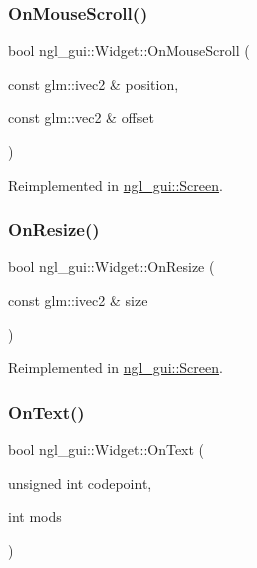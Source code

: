 \subsubsection{\texorpdfstring{On\+Mouse\+Scroll()}{OnMouseScroll()}}
{\footnotesize\ttfamily bool ngl\+\_\+gui\+::\+Widget\+::\+On\+Mouse\+Scroll (\begin{DoxyParamCaption}\item[{const glm\+::ivec2 \&}]{position,  }\item[{const glm\+::vec2 \&}]{offset }\end{DoxyParamCaption})\hspace{0.3cm}{\ttfamily [virtual]}}



Reimplemented in \mbox{\hyperlink{classngl__gui_1_1_screen_a9aca448e61f50b24bfa2a5782424b910}{ngl\+\_\+gui\+::\+Screen}}.

\mbox{\label{classngl__gui_1_1_widget_ab360115cc08879ea3f9b301bdccc05ce}} 
\subsubsection{\texorpdfstring{On\+Resize()}{OnResize()}}
{\footnotesize\ttfamily bool ngl\+\_\+gui\+::\+Widget\+::\+On\+Resize (\begin{DoxyParamCaption}\item[{const glm\+::ivec2 \&}]{size }\end{DoxyParamCaption})\hspace{0.3cm}{\ttfamily [virtual]}}



Reimplemented in \mbox{\hyperlink{classngl__gui_1_1_screen_aa217aa70046107e5626e865c3bd4b385}{ngl\+\_\+gui\+::\+Screen}}.

\mbox{\label{classngl__gui_1_1_widget_ab991bcac876f5652190a81beece5f0f1}} 
\subsubsection{\texorpdfstring{On\+Text()}{OnText()}}
{\footnotesize\ttfamily bool ngl\+\_\+gui\+::\+Widget\+::\+On\+Text (\begin{DoxyParamCaption}\item[{unsigned int}]{codepoint,  }\item[{int}]{mods }\end{DoxyParamCaption})\hspace{0.3cm}{\ttfamily [virtual]}}



